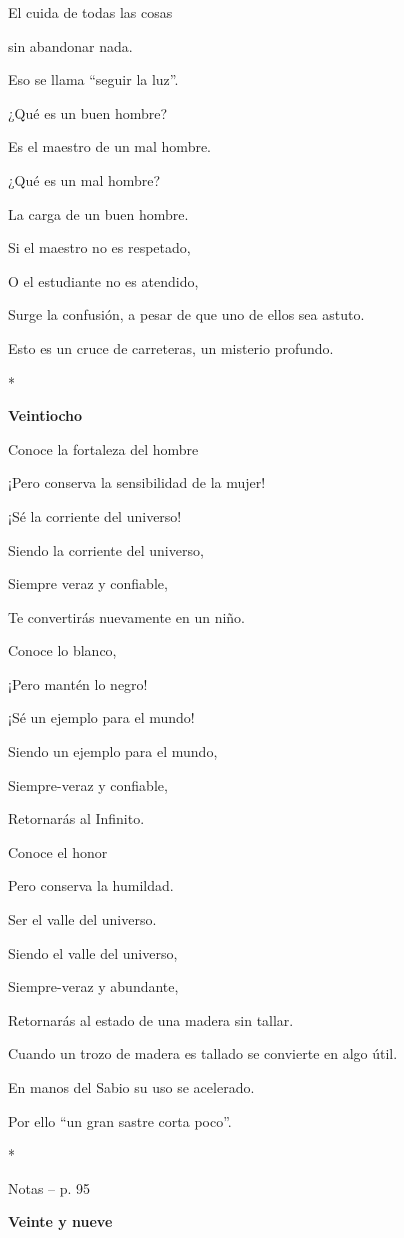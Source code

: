 El cuida de todas las cosas

sin abandonar nada.

Eso se llama ``seguir la luz''.

¿Qué es un buen hombre?

Es el maestro de un mal hombre.

¿Qué es un mal hombre?

La carga de un buen hombre.

Si el maestro no es respetado,

O el estudiante no es atendido,

Surge la confusión, a pesar de que uno de ellos sea astuto.

Esto es un cruce de carreteras, un misterio profundo.

*

\textbf{Veintiocho}

Conoce la fortaleza del hombre

¡Pero conserva la sensibilidad de la mujer!

¡Sé la corriente del universo!

Siendo la corriente del universo,

Siempre veraz y confiable,

Te convertirás nuevamente en un niño.

Conoce lo blanco,

¡Pero mantén lo negro!

¡Sé un ejemplo para el mundo!

Siendo un ejemplo para el mundo,

Siempre-veraz y confiable,

Retornarás al Infinito.

Conoce el honor

Pero conserva la humildad.

Ser el valle del universo.

Siendo el valle del universo,

Siempre-veraz y abundante,

Retornarás al estado de una madera sin tallar.

Cuando un trozo de madera es tallado se convierte en algo útil.

En manos del Sabio su uso se acelerado.

Por ello ``un gran sastre corta poco''.

*

Notas -- p. 95

\textbf{Veinte y nueve}

